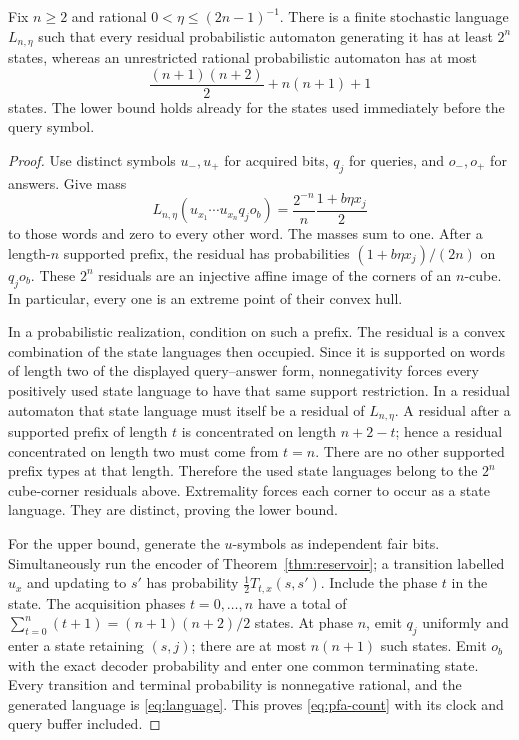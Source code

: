 \begin{theorem}\label{thm:prfa-gap}
Fix $n\ge2$ and rational $0<\eta\le(2n-1)^{-1}$. There is a finite
stochastic language $L_{n,\eta}$ such that every residual probabilistic
automaton generating it has at least $2^n$ states, whereas an unrestricted
rational probabilistic automaton has at most
\begin{equation}\label{eq:pfa-count}
               \frac{(n+1)(n+2)}2+n(n+1)+1
\end{equation}
states. The lower bound holds already for the states used immediately
before the query symbol.
\end{theorem}
\begin{proof}
Use distinct symbols $u_-,u_+$ for acquired bits, $q_j$ for queries,
and $o_-,o_+$ for answers. Give mass
\begin{equation}\label{eq:language}
 L_{n,\eta}(u_{x_1}\cdots u_{x_n}q_j o_b)
             =\frac{2^{-n}}n\frac{1+b\eta x_j}{2}
\end{equation}
to those words and zero to every other word. The masses sum to one.
After a length-$n$ supported prefix, the residual has probabilities
$(1+b\eta x_j)/(2n)$ on $q_j o_b$. These $2^n$ residuals are an
injective affine image of the corners of an $n$-cube. In particular,
every one is an extreme point of their convex hull.

In a probabilistic realization, condition on such a prefix. The residual
is a convex combination of the state languages then occupied. Since it
is supported on words of length two of the displayed query--answer form,
nonnegativity forces every positively used state language to have that
same support restriction. In a residual automaton that state language
must itself be a residual of $L_{n,\eta}$. A residual after a supported
prefix of length $t$ is concentrated on length $n+2-t$; hence a residual
concentrated on length two must come from $t=n$. There are no other
supported prefix types at that length. Therefore the used state languages
belong to the $2^n$ cube-corner residuals above. Extremality forces each
corner to occur as a state language. They are distinct, proving the
lower bound.

For the upper bound, generate the $u$-symbols as independent fair bits.
Simultaneously run the encoder of Theorem~\ref{thm:reservoir}; a
transition labelled $u_x$ and updating to $s'$ has probability
$\frac12 T_{t,x}(s,s')$. Include the phase $t$ in the state. The
acquisition phases $t=0,\ldots,n$ have a total of
$\sum_{t=0}^n(t+1)=(n+1)(n+2)/2$ states. At phase $n$, emit $q_j$
uniformly and enter a state retaining $(s,j)$; there are at most
$n(n+1)$ such states. Emit $o_b$ with the exact decoder probability
and enter one common terminating state. Every transition and terminal
probability is nonnegative rational, and the generated language is
\eqref{eq:language}. This proves \eqref{eq:pfa-count} with its clock
and query buffer included.
\end{proof}
